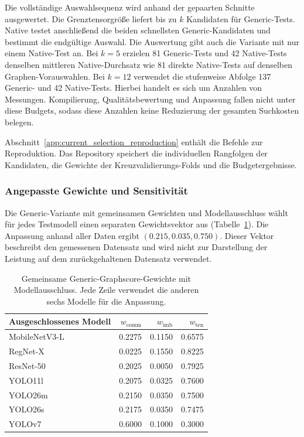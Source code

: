 Die vollständige Auswahlsequenz wird anhand der gepaarten Schnitte ausgewertet. Die Grenztensorgröße liefert bis zu $k$ Kandidaten für Generic-Tests. Native testet anschließend die beiden schnellsten Generic-Kandidaten und bestimmt die endgültige Auswahl. Die Auswertung gibt auch die Variante mit nur einem Native-Test an. Bei $k=5$ erzielen 81 Generic-Tests und 42 Native-Tests denselben mittleren Native-Durchsatz wie 81 direkte Native-Tests auf denselben Graphen-Vorauswahlen. Bei $k=12$ verwendet die stufenweise Abfolge 137 Generic- und 42 Native-Tests. Hierbei handelt es sich um Anzahlen von Messungen. Kompilierung, Qualitätsbewertung und Anpassung fallen nicht unter diese Budgets, sodass diese Anzahlen keine Reduzierung der gesamten Suchkosten belegen.

Abschnitt~\ref{app:current_selection_reproduction} enthält die Befehle zur Reproduktion. Das Repository speichert die individuellen Rangfolgen der Kandidaten, die Gewichte der Kreuzvalidierungs-Folds und die Budgetergebnisse.

\subsubsection{Angepasste Gewichte und Sensitivität}
\label{app:generic_fit_sensitivity}

\begingroup\setlength{\emergencystretch}{1em}
Die Generic-Variante mit gemeinsamen Gewichten und Modellausschluss wählt für jedes Testmodell einen separaten Gewichtsvektor aus (Tabelle~\ref{tab:appendix:generic_fold_weights}). Die Anpassung anhand aller Daten ergibt $(0.215,0.035,0.750)$. Dieser Vektor beschreibt den gemessenen Datensatz und wird nicht zur Darstellung der Leistung auf dem zurückgehaltenen Datensatz verwendet.
\par\endgroup

\begin{table}[!htb]
\centering\small\TableSetup
\caption{Gemeinsame Generic-Graphscore-Gewichte mit Modellausschluss. Jede Zeile verwendet die anderen sechs Modelle für die Anpassung.}
\label{tab:appendix:generic_fold_weights}
\begin{tabular}{@{}lrrr@{}}
\toprule
Ausgeschlossenes Modell & $w_{\mathrm{comm}}$ & $w_{\mathrm{imb}}$ & $w_{\mathrm{ten}}$ \\
\midrule
MobileNetV3-L & \num{0.2275} & \num{0.1150} & \num{0.6575} \\
RegNet-X & \num{0.0225} & \num{0.1550} & \num{0.8225} \\
ResNet-50 & \num{0.2025} & \num{0.0050} & \num{0.7925} \\
YOLO11l & \num{0.2075} & \num{0.0325} & \num{0.7600} \\
YOLO26m & \num{0.2150} & \num{0.0350} & \num{0.7500} \\
YOLO26s & \num{0.2175} & \num{0.0350} & \num{0.7475} \\
YOLOv7 & \num{0.6000} & \num{0.1000} & \num{0.3000} \\
\bottomrule
\end{tabular}
\end{table}

